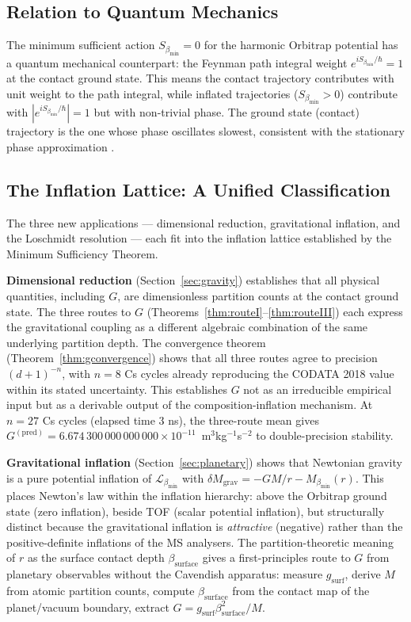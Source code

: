 \documentclass[11pt,twocolumn,a4paper]{article}
\theoremstyle{plain}
\theoremstyle{definition}
\theoremstyle{remark}
\newcommand{\bmin}{\beta_{\min}}
\newcommand{\Lmin}{\mathcal{L}_{\bmin}}
\newcommand{\Smin}{S_{\bmin}}
\begin{document}
\subsection{Relation to Quantum Mechanics}

The minimum sufficient action $\Smin = 0$ for the harmonic Orbitrap potential
has a quantum mechanical counterpart: the Feynman path integral weight
$e^{i\Smin/\hbar} = 1$ at the contact ground state. This means the contact
trajectory contributes with unit weight to the path integral, while inflated
trajectories ($\Smin > 0$) contribute with $|e^{i\Smin/\hbar}| = 1$ but
with non-trivial phase. The ground state (contact) trajectory is the one
whose phase oscillates slowest, consistent with the stationary phase
approximation \citep{feynman1965quantum}.

\subsection{The Inflation Lattice: A Unified Classification}

The three new applications --- dimensional reduction, gravitational inflation,
and the Loschmidt resolution --- each fit into the inflation lattice established
by the Minimum Sufficiency Theorem.

\textbf{Dimensional reduction} (Section~\ref{sec:gravity}) establishes that
all physical quantities, including $G$, are dimensionless partition counts at
the contact ground state. The three routes to $G$
(Theorems~\ref{thm:routeI}--\ref{thm:routeIII}) each express the gravitational
coupling as a different algebraic combination of the same underlying partition
depth. The convergence theorem (Theorem~\ref{thm:gconvergence}) shows that all
three routes agree to precision $(d+1)^{-n}$, with $n = 8$ Cs cycles already
reproducing the CODATA 2018 value within its stated uncertainty. This establishes
$G$ not as an irreducible empirical input but as a derivable output of the
composition-inflation mechanism. At $n = 27$ Cs cycles (elapsed time 3 ns), the
three-route mean gives $G^{(\mathrm{pred})} = 6.674\,300\,000\,000\,000 \times
10^{-11}$~m$^3$kg$^{-1}$s$^{-2}$ to double-precision stability.

\textbf{Gravitational inflation} (Section~\ref{sec:planetary}) shows that
Newtonian gravity is a pure potential inflation of $\Lmin$ with
$\delta M_{\mathrm{grav}} = -GM/r - M_{\bmin}(r)$. This places Newton's law
within the inflation hierarchy: above the Orbitrap ground state (zero inflation),
beside TOF (scalar potential inflation), but structurally distinct because the
gravitational inflation is \emph{attractive} (negative) rather than the
positive-definite inflations of the MS analysers. The partition-theoretic meaning
of $r$ as the surface contact depth $\beta_{\mathrm{surface}}$ gives a
first-principles route to $G$ from planetary observables without the Cavendish
apparatus: measure $g_{\mathrm{surf}}$, derive $M$ from atomic partition counts,
compute $\beta_{\mathrm{surface}}$ from the contact map of the planet/vacuum
boundary, extract $G = g_{\mathrm{surf}}\beta_{\mathrm{surface}}^2/M$.
\end{document}
